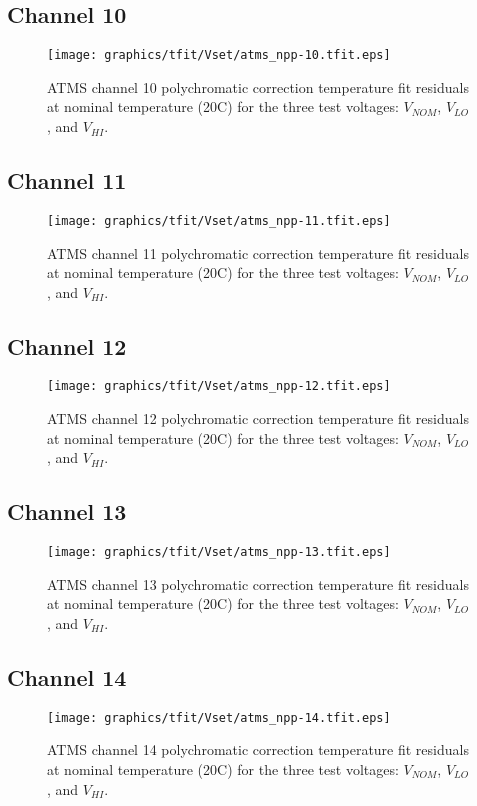 \subsection{Channel 10}
\begin{figure}[H]
  \label{fig:Vset.ch10_tfit}
  \centering
  \texttt{[image: graphics/tfit/Vset/atms\_npp-10.tfit.eps]}
  \caption{ATMS channel 10 polychromatic correction temperature fit residuals at nominal temperature (20\textdegree{}C) for the three test voltages: $V_{NOM}$, $V_{LO}$, and $V_{HI}$.}
\end{figure}

\subsection{Channel 11}
\begin{figure}[H]
  \label{fig:Vset.ch11_tfit}
  \centering
  \texttt{[image: graphics/tfit/Vset/atms\_npp-11.tfit.eps]}
  \caption{ATMS channel 11 polychromatic correction temperature fit residuals at nominal temperature (20\textdegree{}C) for the three test voltages: $V_{NOM}$, $V_{LO}$, and $V_{HI}$.}
\end{figure}

\subsection{Channel 12}
\begin{figure}[H]
  \label{fig:Vset.ch12_tfit}
  \centering
  \texttt{[image: graphics/tfit/Vset/atms\_npp-12.tfit.eps]}
  \caption{ATMS channel 12 polychromatic correction temperature fit residuals at nominal temperature (20\textdegree{}C) for the three test voltages: $V_{NOM}$, $V_{LO}$, and $V_{HI}$.}
\end{figure}

\subsection{Channel 13}
\begin{figure}[H]
  \label{fig:Vset.ch13_tfit}
  \centering
  \texttt{[image: graphics/tfit/Vset/atms\_npp-13.tfit.eps]}
  \caption{ATMS channel 13 polychromatic correction temperature fit residuals at nominal temperature (20\textdegree{}C) for the three test voltages: $V_{NOM}$, $V_{LO}$, and $V_{HI}$.}
\end{figure}

\subsection{Channel 14}
\begin{figure}[H]
  \label{fig:Vset.ch14_tfit}
  \centering
  \texttt{[image: graphics/tfit/Vset/atms\_npp-14.tfit.eps]}
  \caption{ATMS channel 14 polychromatic correction temperature fit residuals at nominal temperature (20\textdegree{}C) for the three test voltages: $V_{NOM}$, $V_{LO}$, and $V_{HI}$.}
\end{figure}

